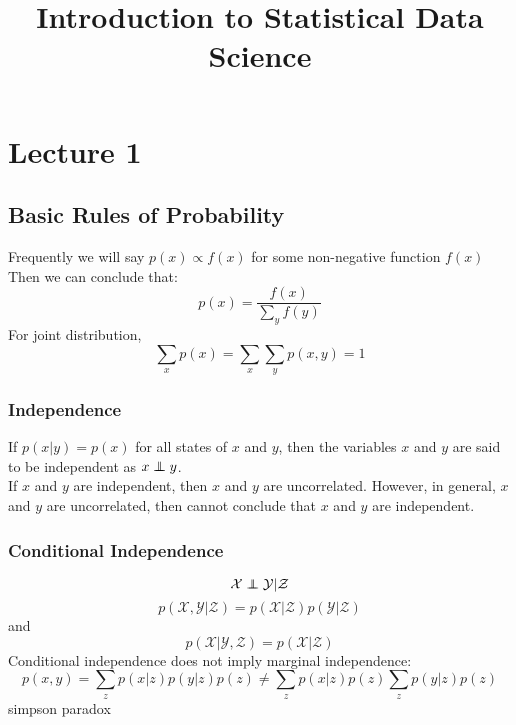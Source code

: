 \documentclass[12pt,a4paper]{article}
\title{Introduction to Statistical Data Science}
\newcommand\independent{\protect\mathpalette{\protect\independenT}{\perp}}
\def\independenT#1#2{\mathrel{\rlap{$#1#2$}\mkern2mu{#1#2}}}
\begin{document}
 

\baselineskip24pt
\maketitle 

\section{Lecture 1}
\subsection*{Basic Rules of Probability}
Frequently we will say $p(x) \propto f(x)$ for some non-negative function $f(x)$\\
Then we can conclude that:
$$
p(x) = \frac{f(x)}{\sum_{y}f(y)}
$$
For joint distribution,
$$
\sum_{x}p(x) = \sum_{x}\sum_{y}p(x,y)=1
$$
\subsubsection*{Independence}
If $p(x|y)=p(x)$ for all states of $x$ and $y$, then the variables $x$ and $y$ are said to be independent as $x \independent y$.\\
If $x$ and $y$ are independent, then $x$ and $y$ are uncorrelated. However, in general, $x$ and $y$ are uncorrelated, then cannot conclude that $x$ and $y$ are independent.\\
\subsubsection*{Conditional Independence}
$$
{\mathcal X} \independent {\mathcal Y}|{\mathcal Z}
$$
$$
p({\mathcal X},{\mathcal Y}|{\mathcal Z}) = p({\mathcal X} |{\mathcal Z})p({\mathcal Y}|{\mathcal Z})
$$ 
and
$$
p({\mathcal X}|{\mathcal Y},{\mathcal Z})=p({\mathcal X}|{\mathcal Z})
$$
Conditional independence does not imply marginal independence:
$$
p(x,y) = \sum_{z}p(x|z)p(y|z)p(z) \neq \sum_{z}p(x|z)p(z) \sum_{z}p(y|z)p(z)
$$
simpson paradox
\end{document}
